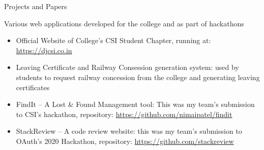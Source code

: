 \documentclass{article}
\newlength{\tabin}
\newlength{\secsep}
\newcommand{\lineunder}{\vspace*{-8pt} \\ \hspace*{-6pt} \hrulefill \\ \vspace*{-15pt}}
\newenvironment{tabbedsection}[1]{
	\begin{list}{}{
		\setlength{\itemsep}{0pt}
		\setlength{\labelsep}{0pt}
		\setlength{\labelwidth}{0pt}
		\setlength{\leftmargin}{\tabin}
		\setlength{\rightmargin}{\tabin}
		\setlength{\listparindent}{0pt}
		\setlength{\parsep}{0pt}
		\setlength{\parskip}{0pt}
		\setlength{\partopsep}{0pt}
		\setlength{\topsep}{#1}
	}
	\item[]
}{\end{list}}
\newenvironment{resume_section}[1]{
	\vspace{2\secsep}
	\textsc{\large#1}
	\lineunder
	\begin{tabbedsection}{\secsep}
}{\end{tabbedsection}}
\newenvironment{resume_subsection}[2][]{
	\textbf{#2} \hfill {\footnotesize #1} \hspace{2em}
	\begin{tabbedsection}{0.5\secsep}
}{\end{tabbedsection}}
\newenvironment{subitems}{
	\renewcommand{\labelitemi}{-}
	\begin{itemize}
		\setlength{\labelsep}{1em}
}{\end{itemize}}
\begin{document}
\begin{resume_section}{Projects and Papers}
	\begin{resume_subsection}{Various web applications developed for the college and as part of hackathons}
		\begin{subitems}
			\item Official Website of College's CSI Student Chapter, running at: \href{https://djcsi.co.in}{https://djcsi.co.in}
			\item Leaving Certificate and Railway Consession
				generation system: used by students to request
				railway concession from the college and
				generating leaving certificates
			\item FindIt -- A Lost {\&} Found Management tool: This was my team's submission to CSI's hackathon, repository: \href{https://github.com/nimaipatel/findit}{https://github.com/nimaipatel/findit}
			\item StackReview -- A code review website: this was my team's submission to OAuth's 2020 Hackathon, repository: \href{https://github.com/stackreview}{https://github.com/stackreview}		\end{subitems}
	\end{resume_subsection}

\end{resume_section}

\vspace{1cm}
\end{document}
